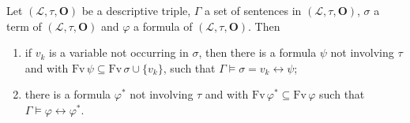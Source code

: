 Let $(\mathcal{L}, \tau, \mathbf{O})$ be a descriptive triple, $\Gamma$ a set of sentences in $(\mathcal{L}, \tau, \mathbf{O})$, $\sigma$ a term of $(\mathcal{L}, \tau, \mathbf{O})$ and $\varphi$ a formula of $(\mathcal{L}, \tau, \mathbf{O})$. Then

\begin{enumerate}
\item[(i)] if $v_k$ is a variable not occurring in $\sigma$, then there is a formula $\psi$ not involving $\tau$ and with $\mathrm{Fv}\,\psi \subseteq \mathrm{Fv}\,\sigma \cup \{v_k\}$, such that $\Gamma \models \sigma = v_k \leftrightarrow \psi$;
\item[(ii)] there is a formula $\varphi^*$ not involving $\tau$ and with $\mathrm{Fv}\,\varphi^* \subseteq \mathrm{Fv}\,\varphi$ such that $\Gamma \models \varphi \leftrightarrow \varphi^*$.
\end{enumerate}
